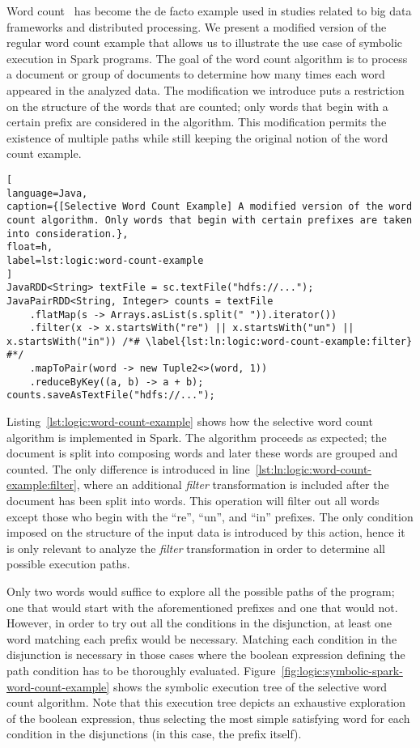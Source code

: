 \label{sec:logic:example}

Word count~\cite{Dean2008} has become the de facto example used in studies related to big data frameworks and distributed processing. We present a modified version of the regular word count example that allows us to illustrate the use case of symbolic execution in Spark programs. The goal of the word count algorithm is to process a document or group of documents to determine how many times each word appeared in the analyzed data. The modification we introduce puts a restriction on the structure of the words that are counted; only words that begin with a certain prefix are considered in the algorithm. This modification permits the existence of multiple paths while still keeping the original notion of the word count example. 

\begin{lstlisting}[
language=Java,
caption={[Selective Word Count Example] A modified version of the word count algorithm. Only words that begin with certain prefixes are taken into consideration.},
float=h,
label=lst:logic:word-count-example
]
JavaRDD<String> textFile = sc.textFile("hdfs://...");
JavaPairRDD<String, Integer> counts = textFile
	.flatMap(s -> Arrays.asList(s.split(" ")).iterator())
	.filter(x -> x.startsWith("re") || x.startsWith("un") || x.startsWith("in")) /*# \label{lst:ln:logic:word-count-example:filter} #*/	
	.mapToPair(word -> new Tuple2<>(word, 1))
	.reduceByKey((a, b) -> a + b);	
counts.saveAsTextFile("hdfs://...");
\end{lstlisting}

Listing~\ref{lst:logic:word-count-example} shows how the selective word count algorithm is implemented in Spark. The algorithm proceeds as expected; the document is split into composing words and later these words are grouped and counted. The only difference is introduced in line~\ref{lst:ln:logic:word-count-example:filter}, where an additional \textit{filter} transformation is included after the document has been split into words. This operation will filter out all words except those who begin with the ``re'', ``un'', and ``in'' prefixes. The only condition imposed on the structure of the input data is introduced by this action, hence it is only relevant to analyze the \textit{filter} transformation in order to determine all possible execution paths.

Only two words would suffice to explore all the possible paths of the program; one that would start with the aforementioned prefixes and one that would not. However, in order to try out all the conditions in the disjunction, at least one word matching each prefix would be necessary. Matching each condition in the disjunction is necessary in those cases where the boolean expression defining the path condition has to be thoroughly evaluated. Figure~\ref{fig:logic:symbolic-spark-word-count-example} shows the symbolic execution tree of the selective word count algorithm. Note that this execution tree depicts an exhaustive exploration of the boolean expression, thus selecting the most simple satisfying word for each condition in the disjunctions (in this case, the prefix itself).

